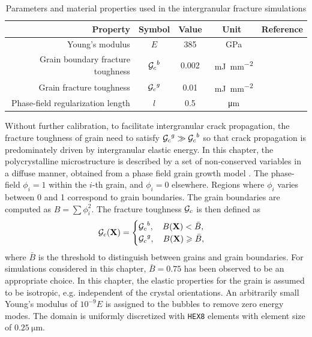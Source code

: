\begin{table}[!htb]
  \centering
  \caption{Parameters and material properties used in the intergranular fracture simulations}
  \begin{tabular}{ r c c c c }
    \toprule
    \textbf{Property}                 & \textbf{Symbol} & \textbf{Value} & \textbf{Unit}                              & \textbf{Reference} \\
    \midrule
    Young's modulus                   & $E$             & 385            & \SI{}{\giga\pascal}                        & \cite{govers_2007} \\
    Grain boundary fracture toughness & ${\mathcal{G}_c}^b$         & 0.002          & \SI{}{\milli\joule\per\square\milli\meter} & \cite{pritam_2016} \\
    Grain fracture toughness          & ${\mathcal{G}_c}^g$         & 0.01           & \SI{}{\milli\joule\per\square\milli\meter} &                    \\
    Phase-field regularization length & $l$             & 0.5            & \SI{}{\micro\meter}                        &                    \\
    \bottomrule
  \end{tabular}
  \label{tab: material properties}
\end{table}

Without further calibration, to facilitate intergranular crack propagation, the fracture toughness of grain need to satisfy ${\mathcal{G}_c}^g \gg {\mathcal{G}_c}^b$
so that crack propagation is predominately driven by intergranular elastic energy. In this chapter, the polycrystalline microstructure is described by a set of non-conserved variables in a diffuse manner, obtained from a phase field grain growth model \cite{Moelans2008}. The phase-field $\phi_i = 1$ within the $i$-th grain, and $\phi_i = 0$ elsewhere. Regions where $\phi_i$ varies between 0 and 1 correspond to grain boundaries. The grain boundaries are computed as $B = \sum\phi_i^2$. The fracture toughness ${\mathcal{G}_c}$ is then defined as
\begin{align}
  {\mathcal{G}_c}(\textbf{X}) =
  \begin{cases}
    {\mathcal{G}_c}^b, \quad B(\textbf{X}) < \bar{B}, \\
    {\mathcal{G}_c}^g, \quad B(\textbf{X}) \geqslant \bar{B},
  \end{cases}
\end{align}
where $\bar{B}$ is the threshold to distinguish between grains and grain boundaries. For simulations considered in this chapter, $\bar{B} = 0.75$ has been observed to be an appropriate choice. In this chapter, the elastic properties for the grain is assumed to be isotropic, e.g. independent of the crystal orientations. An arbitrarily small Young's modulus of $10^{-9}E$ is assigned to the bubbles to remove zero energy modes. The domain is uniformly discretized with \texttt{HEX8} elements with element size of $\SI{0.25}{\micro\meter}$.

